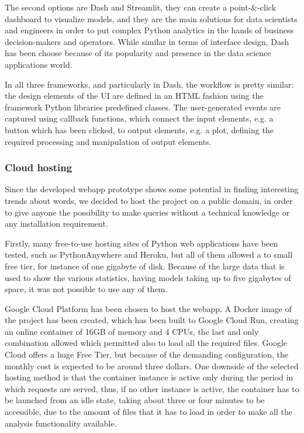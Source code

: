 \noindent The second options are Dash and Streamlit, they can create a point-\&-click dashboard to visualize 
models, and they are the main solutions for data scientists and engineers in order to
put complex Python analytics in the hands of business decision-makers and operators.
While similar in terms of interface design, Dash has been choose because of its popularity and presence in the data science applications world.

In all three frameworks, and particularly in Dash, the workflow is pretty similar: the design elements 
of the UI are defined in an HTML fashion using the framework Python libraries predefined classes.
The user-generated events are captured using callback functions, which connect the input elements, e.g. 
a button which has been clicked, to output
elements, e.g. a plot, defining the required processing and manipulation of output elements.

\subsubsection{Cloud hosting}
Since the developed webapp prototype shows some potential in finding interesting trends about words, we 
decided to host the project on a public domain, in order to give anyone the possibility to make queries 
without a technical knowledge or any installation requirement.

Firstly, many free-to-use hosting sites of Python web applications have been tested, such as PythonAnywhere and Heroku,
but all of them allowed a to small free tier, for instance of one gigabyte of disk. 
Because of the large data that is used to show the various statistics, having models taking up to five gigabytes of space,
it was not possible to use any of them.

Google Cloud Platform has been chosen to host the webapp. A Docker image of the project has been created, which
has been built to Google Cloud Run, creating an online container of 16GB of memory and 4 CPUs, the last and only combination allowed which permitted also to load all the
required files. 
Google Cloud offers a huge Free Tier, but because of the demanding configuration,
the monthly cost is expected to be around three dollars.
One downside of the selected hosting method is that the container instance is active only during the
period in which requests are served, thus, if no other instance is active, the container has to be launched
from an idle state, taking about three or four minutes to be accessible, due to the amount of files that it
has to load in order to make all the analysis functionality available.

